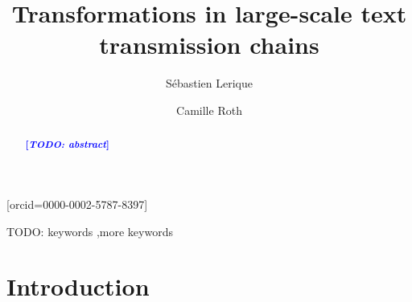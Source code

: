 \documentclass[a4paper,fleqn]{cas-dc}
\newcommand{\tb}[1]{\textcolor{blue}{#1}}
\newcommand{\rk}[1]{\tb{{\footnotesize {\bf[\emph{#1}]}}}}
\begin{document}
\def\textpagefraction{.001}

\title[mode=title]{Transformations in large-scale text transmission chains}

\author[1]{Sébastien Lerique}[orcid=0000-0002-5787-8397]
\cormark[1]
\address[1]{Embodied Cognitive Science Unit, Okinawa Institute of Science and Technology Graduate University, Onna-son, Okinawa 904-0495, Japan}

\author[2,3]{Camille Roth}
\address[2]{Camille's first affiliation}
\address[3]{Camille's second affiliation}


\begin{abstract}
  \rk{TODO: abstract}
\end{abstract}



\begin{keywords}
  TODO: keywords \sep more keywords
\end{keywords}

\maketitle


\section{Introduction}\label{sec:gistr-intro}
\end{document}
